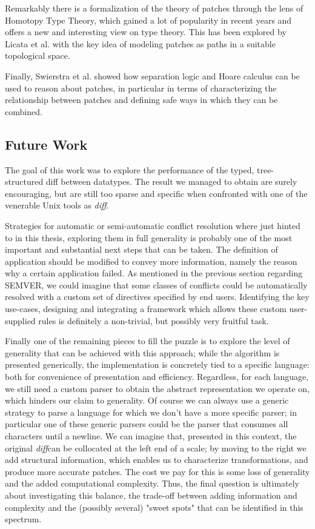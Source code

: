 \documentclass[11pt, titlepage]{article}
\newcommand{\diff}{\emph{diff}}
\begin{document}
Remarkably there is a formalization of the theory of patches through the lens of Homotopy Type Theory, which gained a lot of popularity in recent years and offers a new and interesting view on type theory. This has been explored by Licata et al. \cite{HPT} with the key idea of modeling patches as paths in a suitable topological space. 

Finally, Swierstra et al. \cite{semantics-VC} showed how separation logic and Hoare calculus can be used to reason about patches, in particular in terms of characterizing the relationship between patches and defining safe ways in which they can be combined.

\subsection{Future Work}\label{fut-work}

The goal of this work was to explore the performance of the typed, tree-structured diff between datatypes. The result we managed to obtain are surely encouraging, but are still too sparse and specific when confronted with one of the venerable Unix tools as \diff.

Strategies for automatic or semi-automatic conflict resolution where just hinted to in this thesis, exploring them in full generality is probably one of the most important and substantial next steps that can be taken. The definition of application should be modified to convey more information, namely the reason why a certain application failed. 
As mentioned in the previous section regarding SEMVER, we could imagine that some classes of conflicts could be automatically resolved with a custom set of directives specified by end users. Identifying the key use-cases, designing and integrating a framework which allows these custom user-supplied rules is definitely a non-trivial, but possibly very fruitful task.

Finally one of the remaining pieces to fill the puzzle is to explore the level of generality that can be achieved with this approach; while the algorithm is presented generically, the implementation is concretely tied to a specific language: both for convenience of presentation and efficiency. Regardless, for each language, we still need a custom parser to obtain the abstract representation we operate on, which hinders our claim to generality. Of course we can always use a generic strategy to parse a language for which we don't have a more specific parser; in particular one of these generic parsers could be the parser that consumes all characters until a newline. We can imagine that, presented in this context, the original \diff can be collocated at the left end of a scale; by moving to the right we add structural information, which enables us to characterize transformations, and produce more accurate patches. The cost we pay for this is some loss of generality and the added computational complexity. Thus, the final question is ultimately about investigating this balance, the trade-off between adding information and complexity and the (possibly several) "sweet spots" that can be identified in this spectrum.
\end{document}
